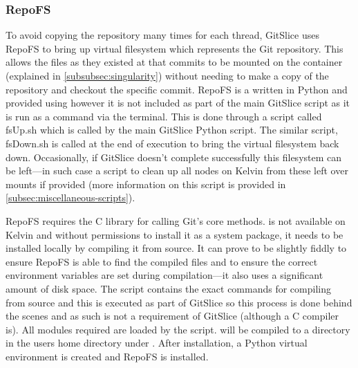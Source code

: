 \documentclass[11pt]{article}
\begin{document}
    \subsubsection{RepoFS}
    \label{subsubsec:repofs}

    To avoid copying the repository many times for each thread, GitSlice uses RepoFS to bring up virtual filesystem which represents the Git repository.
    This allows the files as they existed at that commits to be mounted on the container (explained in \autoref{subsubsec:singularity}) without needing to make a copy of the repository and checkout the specific commit.
    RepoFS is a written in Python and provided using  however it is not included as part of the main GitSlice script as it is run as a command via the terminal.
    This is done through a script called fsUp.sh which is called by the main GitSlice Python script.
    The similar script, fsDown.sh is called at the end of execution to bring the virtual filesystem back down.
    Occasionally, if GitSlice doesn't complete successfully this filesystem can be left---in such case a script to clean up all nodes on Kelvin from these left over mounts if provided (more information on this script is provided in \autoref{subsec:miscellaneous-scripts}).

    RepoFS requires the  C library for calling Git's core methods.
     is not available on Kelvin and without permissions to install it as a system package, it needs to be installed locally by compiling it from source.
    It can prove to be slightly fiddly to ensure RepoFS is able to find the compiled files and to ensure the correct environment variables are set during compilation---it also uses a significant amount of disk space.
    The  script contains the exact commands for compiling  from source and this is executed as part of GitSlice so this process is done behind the scenes and as such  is not a requirement of GitSlice (although a C compiler is).
    All modules required are loaded by the  script.
     will be compiled to a directory in the users home directory under .
    After installation, a Python virtual environment is created and RepoFS is installed.
\end{document}
